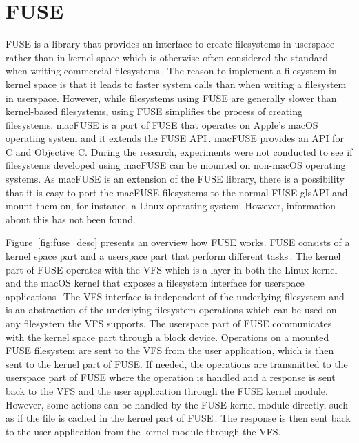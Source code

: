 \section{FUSE}
\label{sec:fuse}
\gls{FUSE} is a library that provides an interface to create filesystems in userspace rather than in kernel space which is otherwise often considered the standard when writing commercial filesystems\,\cite{Libfuse2021}. The reason to implement a filesystem in kernel space is that it leads to faster system calls than when writing a filesystem in userspace. However, while filesystems using \gls{FUSE} are generally slower than \mbox{kernel-based} filesystems, using \gls{FUSE} simplifies the process of creating filesystems. macFUSE is a port of \gls{FUSE} that operates on Apple's macOS operating system and it extends the \gls{FUSE} \gls{API}\,\cite{HomeMacFUSE}. macFUSE provides an \gls{API} for C and Objective C. During the research, experiments were not conducted to see if filesystems developed using macFUSE can be mounted on \mbox{non-macOS} operating systems. As macFUSE is an extension of the \gls{FUSE} library, there is a possibility that it is easy to port the macFUSE filesystems to the normal \gls{FUSE} gls{API} and mount them on, for instance, a Linux operating system. However, information about this has not been found.

Figure~\ref{fig:fuse_desc} presents an overview how \gls{FUSE} works. \gls{FUSE} consists of a kernel space part and a userspace part that perform different tasks\,\cite{vangoorFUSENotFUSE2017}. The kernel part of \gls{FUSE} operates with the \gls{VFS} which is a layer in both the Linux kernel and the macOS kernel that exposes a filesystem interface for userspace applications\,\cite{goochOverviewLinuxVirtual, singhMacOSInternals2006}. The \gls{VFS} interface is independent of the underlying filesystem and is an abstraction of the underlying filesystem operations which can be used on any filesystem the \gls{VFS} supports. The userspace part of \gls{FUSE} communicates with the kernel space part through a block device. Operations on a mounted \gls{FUSE} filesystem are sent to the \gls{VFS} from the user application, which is then sent to the kernel part of \gls{FUSE}. If needed, the operations are transmitted to the userspace part of \gls{FUSE} where the operation is handled and a response is sent back to the \gls{VFS} and the user application through the \gls{FUSE} kernel module. However, some actions can be handled by the \gls{FUSE} kernel module directly, such as if the file is cached in the kernel part of \gls{FUSE}\,\cite{vangoorFUSENotFUSE2017}. The response is then sent back to the user application from the kernel module through the \gls{VFS}.

